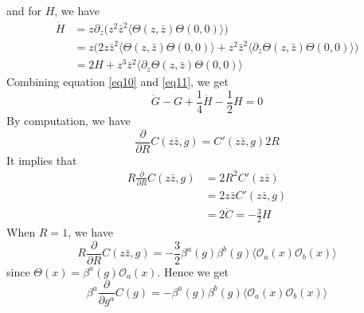 and for $H$, we have
\begin{equation}
\label{eq11}
	\begin{split}
	\dot{H} & = z \partial_z \big( z^2 \bar{z}^2 \langle \Theta(z,\bar{z}) \Theta(0,0) \rangle \big)\\
	& =z \big(2 z \bar{z}^2 \langle \Theta (z,\bar{z}) \Theta(0,0) \rangle + z^2 \bar{z}^2 \langle \partial_z \Theta(z,\bar{z}) \Theta(0,0) \rangle \big)\\
	& = 2H + z^3 \bar{z}^2 \langle \partial_z \Theta(z,\bar{z}) \Theta(0,0)\rangle 
	\end{split}
\end{equation}
Combining equation \ref{eq10} and \ref{eq11}, we get 
\[
\dot{G} - G + \frac{1}{4} \dot{H} - \frac{1}{2} H =0
\]
By computation, we have
\begin{equation}
	\frac{\partial}{\partial R} C(z\bar{z},g) = C'(z \bar{z},g) 2R
\end{equation}
It implies that 
\begin{equation}
	\begin{split}
	R \frac{\partial}{\partial R} C(z\bar{z},g) &= 2R^2 C'(z\bar{z})\\
	 &= 2z \bar{z}C'(z\bar{z},g) \\
	 &= 2 \dot{C} = -\frac{3}{2}H
	\end{split}
\end{equation}
When $R=1$, we have 
\[
R \frac{\partial}{\partial R} C(z\bar{z},g)= - \frac{3}{2} \beta^a(g)\beta^b(g) \langle \mathcal{O}_a(x) \mathcal{O}_b(x) \rangle 
\]
since $\Theta(x)= \beta^a(g) \mathcal{O}_a(x)$. Hence we get
\begin{equation}
	\beta^a \frac{\partial}{\partial g^a} C(g)= -\beta^a(g)\beta^b(g) \langle \mathcal{O}_a(x) \mathcal{O}_b(x) \rangle 
\end{equation}

